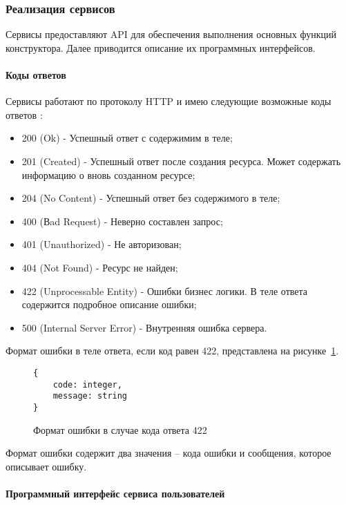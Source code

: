 \subsubsection{Реализация сервисов}

Сервисы предоставляют API для обеспечения выполнения основных функций конструктора.
Далее приводится описание их программных интерфейсов.

\paragraph{Коды ответов}

Сервисы работают по протоколу HTTP и имею следующие возможные
коды ответов :
\begin{itemize}
	\item 200 (Ok) - Успешный ответ с содержимим в теле;
	\item 201 (Created) - Успешный ответ после создания ресурса. Может
	      содержать информацию о вновь созданном ресурсе;
	\item 204 (No Content) - Успешный ответ без содержимого в теле;
	\item 400 (Вad Request) - Неверно составлен запрос;
	\item 401 (Unauthorized) - Не авторизован;
	\item 404 (Not Found) - Ресурс не найден;
	\item 422 (Unprocessable Entity) - Ошибки бизнес логики. В теле ответа
	      содержится подробное описание ошибки;
	\item 500 (Internal Server Error) - Внутренняя ошибка сервера.
\end{itemize}

Формат ошибки в теле ответа, если код равен 422, представлена на
рисунке~\ref{f:error-struct}.


\begin{figure}[!ht]
	\centering
	\vspace{\toppaddingoffigure}
	\begin{lstlisting}
{
    code: integer,
    message: string
}
    \end{lstlisting}
	\caption{Формат ошибки в случае кода ответа 422}
	\label{f:error-struct}
\end{figure}

Формат ошибки содержит два значения – кода ошибки и сообщения,
которое описывает ошибку.

\newpage
\paragraph{Программный интерфейс сервиса пользователей}

